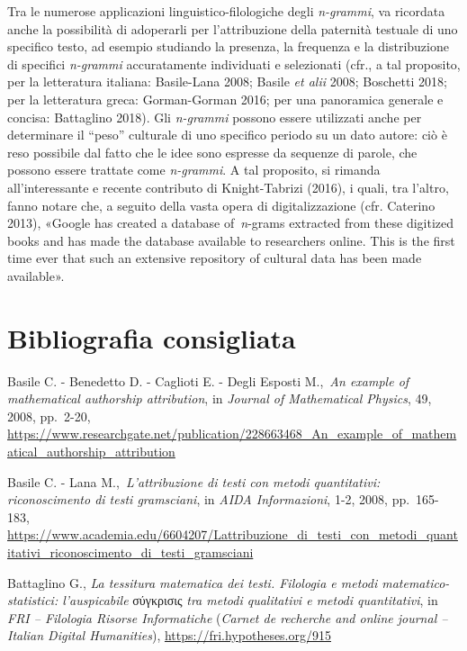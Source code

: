 \documentclass[
  b5paper,
  twoside,
  12pt,
  chapterprefix=false,
  bibliography=totocnumbered,
  parskip=false]{scrbook}
\begin{document}
Tra le numerose applicazioni linguistico-filologiche degli \emph{n-grammi},
va ricordata anche la possibilità di adoperarli per l'attribuzione della
paternità testuale di uno specifico testo, ad esempio studiando la
presenza, la frequenza e la distribuzione di specifici \emph{n-grammi}
accuratamente individuati e selezionati (cfr., a tal proposito, per la
letteratura italiana: Basile-Lana 2008; Basile \emph{et alii} 2008; Boschetti
2018; per la letteratura greca: Gorman-Gorman 2016; per una panoramica
generale e concisa: Battaglino 2018). Gli \emph{n-grammi} possono essere
utilizzati anche per determinare il \enquote{peso} culturale di uno specifico
periodo su un dato autore: ciò è reso possibile dal fatto che le idee
sono espresse da sequenze di parole, che possono essere trattate come
\emph{n-grammi}. A tal proposito, si rimanda all'interessante e recente
contributo di Knight-Tabrizi (2016), i quali, tra l'altro, fanno notare
che, a seguito della vasta opera di digitalizzazione (cfr. Caterino
2013), «Google has created a database of~\emph{n}-grams extracted from these
digitized books and has made the database available to researchers
online. This is the first time ever that such an extensive repository of
cultural data has been made available».

\hypertarget{bibliografia-consigliata-16}{%
\section*{Bibliografia consigliata}\label{bibliografia-consigliata-16}}

Basile C. - Benedetto D. - Caglioti E. - Degli Esposti M.,~\emph{An example
of mathematical authorship attribution}, in \emph{Journal of Mathematical
Physics}, 49, 2008, pp.~2-20,
\url{https://www.researchgate.net/publication/228663468_An_example_of_mathematical_authorship_attribution}

Basile C. - Lana M.,~\emph{L'attribuzione di testi con metodi quantitativi:
riconoscimento di testi gramsciani}, in \emph{AIDA Informazioni}, 1-2, 2008,
pp.~165-183,
\url{https://www.academia.edu/6604207/Lattribuzione_di_testi_con_metodi_quantitativi_riconoscimento_di_testi_gramsciani}

Battaglino G., \emph{La tessitura matematica dei testi. Filologia e metodi
matematico-statistici: l'auspicabile} σύγκρισις \emph{tra metodi qualitativi
e metodi quantitativi}, in \emph{FRI -- Filologia Risorse Informatiche}
(\emph{Carnet de recherche and online journal -- Italian Digital
Humanities}),
\url{https://fri.hypotheses.org/915}
\end{document}
